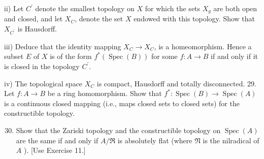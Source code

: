 \documentclass{standalone}
\theoremstyle{definition}
\theoremstyle{remark}
\begin{document}
ii) Let $C^{\prime}$ denote the smallest topology on $X$ for which the sets $X_{g}$ are both open and closed, and let $X_{C}$, denote the set $X$ endowed with this topology. Show that $X_{C^{\prime}}$ is Hausdorff.

iii) Deduce that the identity mapping $X_{C} \rightarrow X_{C}$, is a homeomorphism. Hence a subset $E$ of $X$ is of the form $f^{*}(\operatorname{Spec}(B))$ for some $f: A \rightarrow B$ if and only if it is closed in the topology $C^{\prime}$.

iv) The topological space $X_{C}$ is compact, Hausdorff and totally disconnected. 29. Let $f: A \rightarrow B$ be a ring homomorphism. Show that $f^{*}: \operatorname{Spec}(B) \rightarrow \operatorname{Spec}(A)$ is a continuous closed mapping (i.e., maps closed sets to closed sets) for the constructible topology.

\begin{enumerate}
  \setcounter{enumi}{29}
  \item Show that the Zariski topology and the constructible topology on $\operatorname{Spec}(A)$ are the same if and only if $A / \mathfrak{R}$ is absolutely flat (where $\mathfrak{N}$ is the nilradical of $A$ ). [Use Exercise 11.]
\end{enumerate}
\end{document}
